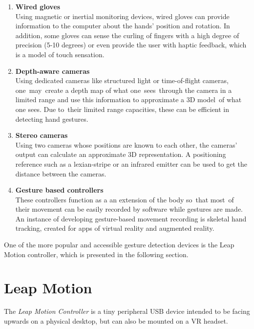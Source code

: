 \documentclass[12pt,a4paper,twoside]{report}
\begin{document}
\begin{enumerate}
  \item \textbf{Wired gloves} \\
    Using magnetic or inertial monitoring devices, wired gloves can provide information to the computer about the hands' position and rotation. In addition, some gloves can sense the curling of fingers with a high degree of precision (5-10 degrees) or even provide the user with haptic feedback, which is a model of touch sensation. \cite{Zimmerman:1986:HGI:1165387.275628}
  \item \textbf{Depth-aware cameras} \\
    Using dedicated cameras like structured light or time-of-flight cameras, one may create a depth map of what one sees through the camera in a limited range and use this information to approximate a 3D model of what one sees. Due to their limited range capacities, these can be efficient in detecting hand gestures. \cite{DepthCamera}
  \item \textbf{Stereo cameras} \\
    Using two cameras whose positions are known to each other, the cameras' output can calculate an approximate 3D representation. A positioning reference such as a lexian-stripe or an infrared emitter can be used to get the distance between the cameras. \cite{StereoCamera}
  \item \textbf{Gesture based controllers} \\
    These controllers function as a an extension of the body so that most of their movement can be easily recorded by software while gestures are made. An instance of developing gesture-based movement recording is skeletal hand tracking, created for apps of virtual reality and augmented reality.
\end{enumerate}

One of the more popular and accessible gesture detection devices is the Leap Motion controller, which is presented in the following section. 

\section{Leap Motion}

The \textit{Leap Motion Controller} is a tiny peripheral USB device intended to be facing upwards on a physical desktop, but can also be mounted on a VR headset.
\end{document}
